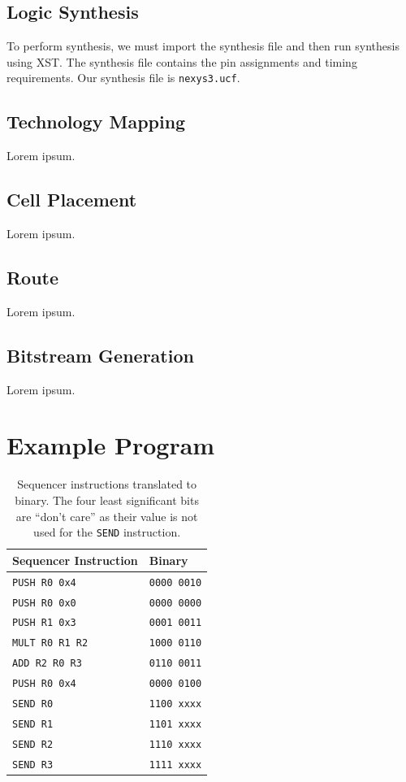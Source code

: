 \documentclass[]{article}
\begin{document}
\subsection{Logic Synthesis}

To perform synthesis, we must import the synthesis file and then run synthesis using XST. The synthesis file contains the pin assignments and timing requirements. Our synthesis file is \texttt{nexys3.ucf}.

\subsection{Technology Mapping}

Lorem ipsum.

\subsection{Cell Placement}

Lorem ipsum.

\subsection{Route}

Lorem ipsum.

\subsection{Bitstream Generation}

Lorem ipsum.

\section{Example Program}

\begin{table}[H]
\centering
\begin{tabular}{ l | l }
\textbf{Sequencer Instruction} & \textbf{Binary}\\\hline
\texttt{PUSH R0 0x4} & \texttt{0000 0010}\\
\texttt{PUSH R0 0x0} & \texttt{0000 0000}\\
\texttt{PUSH R1 0x3} & \texttt{0001 0011}\\
\texttt{MULT R0 R1 R2} & \texttt{1000 0110}\\
\texttt{ADD R2 R0 R3} & \texttt{0110 0011}\\
\texttt{PUSH R0 0x4} & \texttt{0000 0100}\\
\texttt{SEND R0} & \texttt{1100  xxxx}\\
\texttt{SEND R1} & \texttt{1101  xxxx}\\
\texttt{SEND R2} & \texttt{1110  xxxx}\\
\texttt{SEND R3} & \texttt{1111  xxxx}\\
\end{tabular}
\caption{Sequencer instructions translated to binary. The four least significant bits are ``don't care'' as their value is not used for the \texttt{SEND} instruction.}
\label{table:translation}
\end{table}
\end{document}
